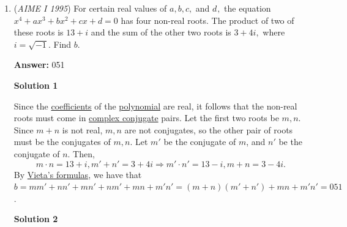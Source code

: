 \begin{enumerate}
 Let $A$ be defined as the origin of a coordinate plane with the $y$-axis running across the chord and $C(6\sqrt{2},0)$ by the \href{https://artofproblemsolving.com/wiki/index.php?title=Pythagorean\_Theorem}{Pythagorean Theorem}. Then we have $D(0,-6)$ and $F(6\sqrt{2},-3)$, and since $\frac{DE}{DF}=\frac{1}{3}$, the point $E$ is one-third of the way from $D$ to $F$, so point $E$ has coordinates $(2\sqrt{2},-5)$. $E$ is the center of the circle with radius $9$, so the equation of this circle is $(x-2\sqrt{2})^2+(y+5)^2=81$. Since the chord's equation is $y=0$, we must find all values of $x$ satisfying the equation of the circle such that $y=0$. We find that $x-2\sqrt{2}=\pm\sqrt{56}$, so the chord has length $|\sqrt{56}+2\sqrt{2}-(-\sqrt{56}+2\sqrt{2})|=2\sqrt{56}$ and the answer is $(2\sqrt{56})^2=\boxed{224}$.

 \textbf{Note} For more practice, try 2005 AIME II \#8. The idea is identical and it is just more work. 

 


	\item (\textit{AIME I 1995}) For certain real values of $a, b, c,$ and $d_{},$  the equation $x^4+ax^3+bx^2+cx+d=0$ has four non-real roots.  The product of two of these roots is $13+i$ and the sum of the other two roots is $3+4i,$ where $i=\sqrt{-1}.$  Find $b.$

 \textbf{Answer: }051



\textbf{Solution 1}

Since the \href{https://artofproblemsolving.com/wiki/index.php?title=Coefficient}{coefficients} of the \href{https://artofproblemsolving.com/wiki/index.php?title=Polynomial}{polynomial} are real, it follows that the non-real roots must come in \href{https://artofproblemsolving.com/wiki/index.php?title=Complex\_conjugate}{complex conjugate} pairs. Let the first two roots be $m,n$. Since $m+n$ is not real, $m,n$ are not conjugates, so the other pair of roots must be the conjugates of $m,n$. Let $m'$ be the conjugate of $m$, and $n'$ be the conjugate of $n$. Then,
 \[m\cdot n = 13 + i,m' + n' = 3 + 4i\Longrightarrow m'\cdot n' = 13 - i,m + n = 3 - 4i.\]By \href{https://artofproblemsolving.com/wiki/index.php?title=Vieta\%27s\_formulas}{Vieta's formulas}, we have that $b = mm' + nn' + mn' + nm' + mn + m'n' = (m + n)(m' + n') + mn + m'n' = \boxed{051}$.

 



\textbf{Solution 2}


\end{enumerate}
